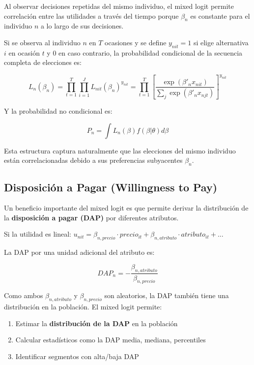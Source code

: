 \documentclass[
]{book}
\providecommand{\tightlist}{%
  \setlength{\itemsep}{0pt}\setlength{\parskip}{0pt}}
\begin{document}
Al observar decisiones repetidas del mismo individuo, el mixed logit permite correlación entre las utilidades a través del tiempo porque \(\beta_n\) es constante para el individuo \(n\) a lo largo de sus decisiones.

Si se observa al individuo \(n\) en \(T\) ocasiones y se define \(y_{nit} = 1\) si elige alternativa \(i\) en ocasión \(t\) y 0 en caso contrario, la probabilidad condicional de la secuencia completa de elecciones es:

\begin{equation}
L_n(\beta_n) = \prod_{t=1}^T \prod_{i=1}^J L_{nit}(\beta_n)^{y_{nit}} = \prod_{t=1}^T \left[\frac{\exp(\beta'_n x_{nit})}{\sum_j \exp(\beta'_n x_{njt})}\right]^{y_{nit}}
\label{eq:seqprob}
\end{equation}

Y la probabilidad no condicional es:

\begin{equation}
P_n = \int L_n(\beta) f(\beta|\theta) d\beta
\label{eq:panelprob}
\end{equation}

Esta estructura captura naturalmente que las elecciones del mismo individuo están correlacionadas debido a sus preferencias subyacentes \(\beta_n\).

\hypertarget{disposiciuxf3n-a-pagar-willingness-to-pay}{%
\subsection{Disposición a Pagar (Willingness to Pay)}\label{disposiciuxf3n-a-pagar-willingness-to-pay}}

Un beneficio importante del mixed logit es que permite derivar la distribución de la \textbf{disposición a pagar (DAP)} por diferentes atributos.

Si la utilidad es lineal: \(u_{nit} = \beta_{n,precio} \cdot precio_{it} + \beta_{n,atributo} \cdot atributo_{it} + ...\)

La DAP por una unidad adicional del atributo es:

\begin{equation}
DAP_n = -\frac{\beta_{n,atributo}}{\beta_{n,precio}}
\label{eq:wtp}
\end{equation}

Como ambos \(\beta_{n,atributo}\) y \(\beta_{n,precio}\) son aleatorios, la DAP también tiene una distribución en la población. El mixed logit permite:

\begin{enumerate}
\def\labelenumi{\arabic{enumi}.}
\tightlist
\item
  Estimar la \textbf{distribución de la DAP} en la población
\item
  Calcular estadísticos como la DAP media, mediana, percentiles
\item
  Identificar segmentos con alta/baja DAP
\end{enumerate}
\end{document}

